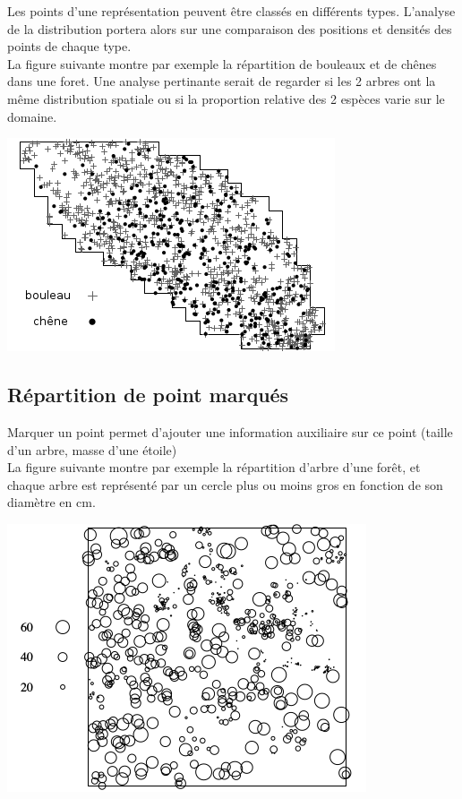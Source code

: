 \documentclass[french,12pt,a4paper]{report}
\begin{document}
\begin{minipage}{0.5\linewidth}
\indent
Les points d'une représentation peuvent être classés en différents types. L'analyse de la distribution portera alors sur une comparaison des positions et densités des points de chaque type.\\

La figure suivante montre par exemple la répartition de bouleaux et de chênes dans une foret. Une analyse pertinante serait de regarder si les 2 arbres ont la même distribution spatiale ou si la proportion relative des 2 espèces varie sur le domaine. 
\end{minipage}\hfill
\begin{minipage}{0.5\linewidth}
\includegraphics[scale=0.75]{images/diffPoints.png}
\end{minipage}


\subsection{Répartition de point marqués}
\begin{minipage}{0.5\linewidth}
\indent
Marquer un point permet d'ajouter une information auxiliaire sur ce point (taille d'un arbre, masse d'une étoile)\\

La figure suivante montre par exemple la répartition d'arbre d'une forêt, et chaque arbre est représenté par un cercle plus ou moins gros en fonction de son diamètre en cm.
\end{minipage}\hfill
\begin{minipage}{0.5\linewidth}
\includegraphics[scale=0.6]{images/pointsMarques.png}
\end{minipage}
\end{document}
